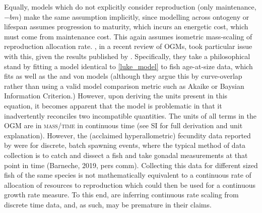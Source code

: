 \documentclass[a4paper]{article} %
\begin{document}
Equally, models which do not explicitly consider reproduction (only maintenance, $-bm$) make the same assumption implicitly, since modelling across ontogeny or lifespan assumes progression to maturity, which incurs an energetic cost, which must come from maintenance cost. This again assumes isometric mass-scaling of reproduction allocation rate. \cite{Marshall2019b}, in a recent review of OGMs, took particular issue with this, given the results published by \cite{Barneche2018d}. Specifically, they take a philosophical stand by fitting a model identical to \cref{luke_model} to fish age-at-size data, which fits as well as the \cite{West2001} and von \cite{vonBert1938} models (although they argue this by curve-overlap rather than using a valid model comparison metric such as Akaike or Baysian Information Criterion.) However, upon deriving the units present in this equation, it becomes apparent that the \cite{Marshall2019b} model is problematic in that it inadvertently reconciles two incompatible quantities. The units of all terms in the OGM are in \textsc{mass/time} in continuous time (see SI for full derivation and unit explanation). However, the (acclaimed hyperallometric) fecundity data reported by \cite{Barneche2018d} were for discrete, batch spawning events, where the typical method of data collection is to catch and dissect a fish and take gonadal measurements at that point in time (Barneche, 2019, pers comm). Collecting this data for different sized fish of the same species is not mathematically equivalent to a continuous rate of allocation of resources to reproduction which could then be used for a continuous growth rate measure. To this end, \cite{Marshall2019b} are inferring continuous rate scaling from discrete time data, and, as such, may be premature in their claims.    
\end{document}
